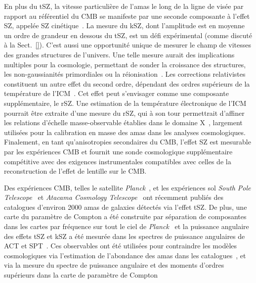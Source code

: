 En plus du tSZ, la vitesse particulière de l'amas le long
de la ligne de visée par rapport au référentiel du CMB se manifeste
par une seconde composante à l'effet SZ, appelée SZ
cinétique~\citep[kSZ;][]{Sunyaev1980}. La mesure du kSZ, dont
l'amplitude est en moyenne un ordre de grandeur en dessous du tSZ, est
un défi expérimental (comme discuté à la Sect.~\ref{}). C'est aussi une
opportunité unique de mesurer le champ de vitesses des grandes
structures de l'univers. Une telle mesure aurait des implications
multiples pour la cosmologie, permettant de sonder la croissance des
structures, les non-gaussianités primordiales ou la
réionisation~\citep[voir][par exemple]{SO2019}. 
Les corrections relativistes constituent un autre effet du second
ordre, dépendant des ordres supérieurs de la température de
l'ICM~\citep[voir \emph{e.\,g.}][]{Chluba2012}. Cet effet peut s'envisager comme une composante
supplémentaire, le rSZ. Une estimation de la
température électronique de l'ICM pourrait être
extraite d'une mesure du rSZ, qui à son tour permettrait d'affiner les
relations d'échelle masse-observable établies dans le domaine
X~\citep[voir \emph{e.\,g.}][]{Pratt2009}, largement utilisées pour la
calibration en masse des amas dans les analyses cosmologiques. Finalement, en tant
qu'anisotropies secondaires du CMB, l'effet SZ est mesurable par les
expériences CMB et fournit une sonde cosmologique supplémentaire
compétitive avec des exigences instrumentales compatibles avec celles
de la reconstruction de l'effet de lentille sur le CMB. 

Des expériences CMB, telles le satellite \emph{Planck}~\citep{Planck2016_SZcat}, et les
expériences sol \emph{South Pole Telescope}~\citep[SPT;][]{Bleem2015, Bleem2019}
et \emph{Atacama Cosmology Telescope}~\citep[ACT;][]{Hasselfield2013_ACT_SZ} ont récemment
publiés des catalogues d'environ 2000 amas de galaxies détectés via
l'effet tSZ. De plus, une carte du paramètre de Compton a été
construite par séparation de composantes dans les cartes par fréquence
sur tout le ciel de \emph{Planck}~\citep{Planck2016_ymap} et la
puissance angulaire des effets tSZ et kSZ a été mesurée dans les
spectres de puissance angulaires de ACT et
SPT~\citep[\emph{e.g.}]{Dunkley2013, George2015}.
Ces observables ont été utilisées pour contraindre les modèles
cosmologiques via l'estimation de l'abondance des amas dans les
catalogues~\citep{Planck_2016_SZ_cosmo, Hasselfield2013_ACT_SZ,
deHaan2016, Bocquet2019, Zulbedia2019}, et via la mesure du spectre de puissance
angulaire et des moments d'ordres supérieurs dans la carte de
paramètre de Compton~\citep{Planck2016_ymap, Hurier2017, Bolliet2018, Bolliet2019,
Salvati2018} 


